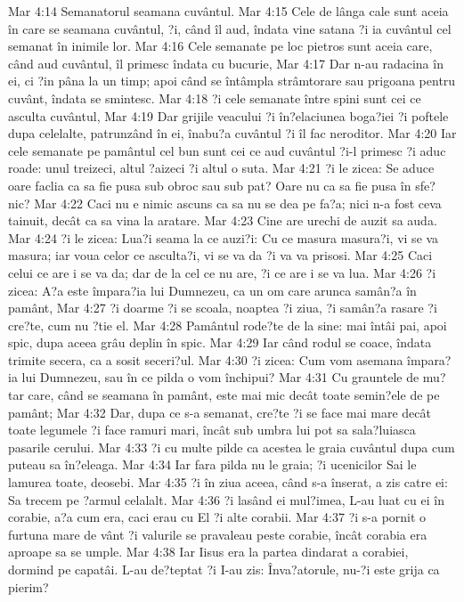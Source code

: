Mar 4:14  Semanatorul seamana cuvântul.
Mar 4:15  Cele de lânga cale sunt aceia în care se seamana cuvântul, ?i, când îl aud, îndata vine satana ?i ia cuvântul cel semanat în inimile lor.
Mar 4:16  Cele semanate pe loc pietros sunt aceia care, când aud cuvântul, îl primesc îndata cu bucurie,
Mar 4:17  Dar n-au radacina în ei, ci ?in pâna la un timp; apoi când se întâmpla strâmtorare sau prigoana pentru cuvânt, îndata se smintesc.
Mar 4:18  ?i cele semanate între spini sunt cei ce asculta cuvântul,
Mar 4:19  Dar grijile veacului ?i în?elaciunea boga?iei ?i poftele dupa celelalte, patrunzând în ei, înabu?a cuvântul ?i îl fac neroditor.
Mar 4:20  Iar cele semanate pe pamântul cel bun sunt cei ce aud cuvântul ?i-l primesc ?i aduc roade: unul treizeci, altul ?aizeci ?i altul o suta.
Mar 4:21  ?i le zicea: Se aduce oare faclia ca sa fie pusa sub obroc sau sub pat? Oare nu ca sa fie pusa în sfe?nic?
Mar 4:22  Caci nu e nimic ascuns ca sa nu se dea pe fa?a; nici n-a fost ceva tainuit, decât ca sa vina la aratare.
Mar 4:23  Cine are urechi de auzit sa auda.
Mar 4:24  ?i le zicea: Lua?i seama la ce auzi?i: Cu ce masura masura?i, vi se va masura; iar voua celor ce asculta?i, vi se va da ?i va va prisosi.
Mar 4:25  Caci celui ce are i se va da; dar de la cel ce nu are, ?i ce are i se va lua.
Mar 4:26  ?i zicea: A?a este împara?ia lui Dumnezeu, ca un om care arunca samân?a în pamânt,
Mar 4:27  ?i doarme ?i se scoala, noaptea ?i ziua, ?i samân?a rasare ?i cre?te, cum nu ?tie el.
Mar 4:28  Pamântul rode?te de la sine: mai întâi pai, apoi spic, dupa aceea grâu deplin în spic.
Mar 4:29  Iar când rodul se coace, îndata trimite secera, ca a sosit seceri?ul.
Mar 4:30  ?i zicea: Cum vom asemana împara?ia lui Dumnezeu, sau în ce pilda o vom închipui?
Mar 4:31  Cu grauntele de mu?tar care, când se seamana în pamânt, este mai mic decât toate semin?ele de pe pamânt;
Mar 4:32  Dar, dupa ce s-a semanat, cre?te ?i se face mai mare decât toate legumele ?i face ramuri mari, încât sub umbra lui pot sa sala?luiasca pasarile cerului.
Mar 4:33  ?i cu multe pilde ca acestea le graia cuvântul dupa cum puteau sa în?eleaga.
Mar 4:34  Iar fara pilda nu le graia; ?i ucenicilor Sai le lamurea toate, deosebi.
Mar 4:35  ?i în ziua aceea, când s-a înserat, a zis catre ei: Sa trecem pe ?armul celalalt.
Mar 4:36  ?i lasând ei mul?imea, L-au luat cu ei în corabie, a?a cum era, caci erau cu El ?i alte corabii.
Mar 4:37  ?i s-a pornit o furtuna mare de vânt ?i valurile se pravaleau peste corabie, încât corabia era aproape sa se umple.
Mar 4:38  Iar Iisus era la partea dindarat a corabiei, dormind pe capatâi. L-au de?teptat ?i I-au zis: Înva?atorule, nu-?i este grija ca pierim?
